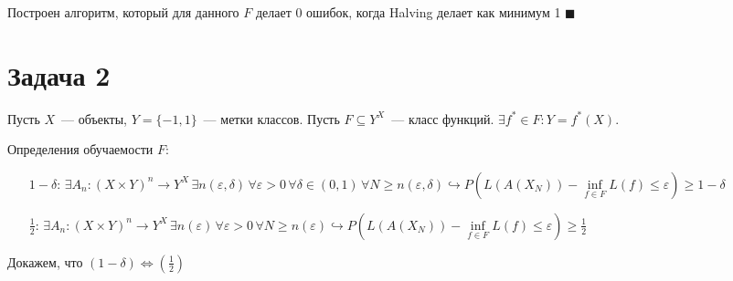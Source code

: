 \documentclass[a4paper]{article}
\def\eps{\varepsilon}
\begin{document}
Построен алгоритм, который для данного $F$ делает 0 ошибок, когда Halving делает как минимум 1 $\blacksquare$
\section*{Задача 2}
Пусть $X$~--- объекты, $Y=\{-1,1\}$~--- метки классов. Пусть $F\subseteq Y^X$~--- класс функций. $\exists f^*\in F\colon Y=f^*(X)$.

Определения обучаемости $F$:
\begin{enumerate}
\item[$1-\delta$:] $\exists A_n\colon (X\times Y)^n\to Y^X\,\exists n(\eps,\delta)\,\forall \eps >0\,\forall\delta\in (0,1) \,\forall N\geqslant n(\eps,\delta)\hookrightarrow P(L(A(X_N))-\inf\limits_{f\in F}L(f)\leqslant \eps)\geqslant 1-\delta$
\item[$\frac{1}{2}$:] $\exists A_n\colon (X\times Y)^n\to Y^X\,\exists n(\eps)\,\forall \eps >0\,\forall N\geqslant n(\eps)\hookrightarrow P(L(A(X_N))-\inf\limits_{f\in F}L(f)\leqslant \eps)\geqslant \frac{1}{2}$
\end{enumerate}
Докажем, что $(1-\delta)\Leftrightarrow(\frac{1}{2})$
\end{document}
